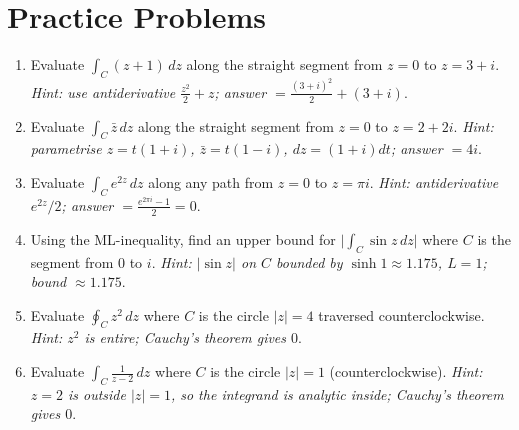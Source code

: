 \documentclass[12pt,a4paper]{article}
\begin{document}
\section{Practice Problems}
\begin{enumerate}[label=\textbf{PP\arabic*.}, leftmargin=*]
  \item Evaluate $\int_C (z+1)\,dz$ along the straight segment from
        $z=0$ to $z=3+i$.
        \textit{Hint: use antiderivative $\frac{z^2}{2}+z$; answer
        $= \frac{(3+i)^2}{2} + (3+i)$}.

  \item Evaluate $\int_C \bar z\,dz$ along the straight segment from
        $z=0$ to $z=2+2i$.
        \textit{Hint: parametrise $z = t(1+i)$, $\bar z = t(1-i)$,
        $dz=(1+i)dt$; answer $= 4i$}.

  \item Evaluate $\int_C e^{2z}\,dz$ along any path from $z=0$ to
        $z=\pi i$.
        \textit{Hint: antiderivative $e^{2z}/2$;
        answer $= \frac{e^{2\pi i}-1}{2} = 0$}.

  \item Using the ML-inequality, find an upper bound for
        $\bigl|\int_C \sin z\,dz\bigr|$ where $C$ is the segment from
        $0$ to $i$.
        \textit{Hint: $|\sin z|$ on $C$ bounded by $\sinh 1 \approx 1.175$,
        $L=1$; bound $\approx 1.175$}.

  \item Evaluate $\oint_C z^2\,dz$ where $C$ is the circle $|z|=4$
        traversed counterclockwise.
        \textit{Hint: $z^2$ is entire; Cauchy's theorem gives $0$}.

  \item Evaluate $\int_C \frac{1}{z-2}\,dz$ where $C$ is the circle
        $|z|=1$ (counterclockwise).
        \textit{Hint: $z=2$ is outside $|z|=1$, so the integrand is
        analytic inside; Cauchy's theorem gives $0$}.
\end{enumerate}

\end{document}
